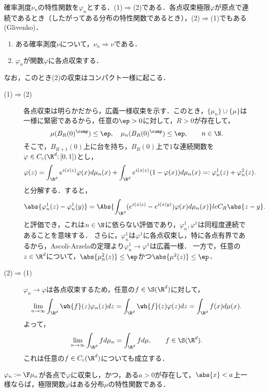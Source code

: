 \documentclass[uplatex,dvipdfmx]{jsreport}
\begin{document}
\begin{theorem}[Glivenkoの連続定理]
    確率測度$\nu_n$の特性関数を$\varphi_n$とする．(1)$\Rightarrow$(2)である．各点収束極限$\varphi$が原点で連続であるとき（したがってある分布の特性関数であるとき），(2)$\Rightarrow$(1)でもある(Glivenko)．
    \begin{enumerate}
        \item ある確率測度$\nu$について，$\nu_n\Rightarrow\nu$である．
        \item $\varphi_n$が関数$\varphi$に各点収束する．
    \end{enumerate}
    なお，このとき(2)の収束はコンパクト一様に起こる．
\end{theorem}
\begin{Proof}\mbox{}
    \begin{description}
        \item[(1)$\Rightarrow$(2)] 各点収束は明らかだから，広義一様収束を示す．このとき，$\{\mu_n\}\cup\{\mu\}$は一様に緊密であるから，任意の$\ep>0$に対して，$R>0$が存在して，
        \[\mu(B_R(0)^\comp)\le\ep,\quad\mu_n(B_R(0)^\comp)\le\ep,\qquad n\in\N.\]
        そこで，$B_{R+1}(0)$上に台を持ち，$B_R(0)$上で$1$な連続関数を$\varphi\in C_c(\R^d;[0,1])$とし，
        \[\varphi(z)=\int_{\R^d}e^{i(x|z)}\varphi(x)d\mu_n(x)+\int_{\R^d}e^{i(x|z)}(1-\varphi(x))d\mu_n(x)=:\varphi^1_n(z)+\varphi^2_n(z).\]
        と分解する．すると，
        \[\abs{\varphi^1_n(z)-\varphi^1_n(y)}=\Abs{\int_{\R^d}(e^{i(x|z)}-e^{i(x|y)})\varphi(x)d\mu_n(x)}le C_R\abs{z-y}.\]
        と評価でき，これは$n\in\N$に依らない評価であり，$\varphi^1_n,\varphi^1$は同程度連続であることを意味する．
        さらに，$\varphi^1_n$は$\varphi^1$に各点収束し，特に各点有界であるから，Ascoli-Arzelaの定理より$\varphi^1_n\to\varphi^1$は広義一様．
        一方で，任意の$z\in\R^d$について，$\abs{\mu^2_n(z)}\le\ep$かつ$\abs{\mu^2(z)}\le\ep$．
        \item[(2)$\Rightarrow$(1)] $\varphi_n\to\varphi$は各点収束するため，任意の$f\in\S(\R^d)$に対して，
        \[\lim_{n\to\infty}\int_{\R^d}\wh{f}(z)\varphi_n(z)dz=\int_{\R^d}\wh{f}(z)\varphi(z)dz=\int_{\R^d}f(x)d\mu(x).\]
        よって，
        \[\lim_{n\to\infty}\int_{\R^d}fd\mu_n=\int_{\R^d}fd\mu,\qquad f\in\S(\R^d).\]
        これは任意の$f\in C_c(\R^d)$についても成立する．
    \end{description}
\end{Proof}

\begin{theorem}[Levyの収束定理]
    $\varphi_n:=\F\mu_n$が各点で$\varphi$に収束し，かつ，ある$a>0$が存在して，$\abs{x}<a$上一様ならば，極限関数$\varphi$はある分布$\mu$の特性関数である．
\end{theorem}
\end{document}
